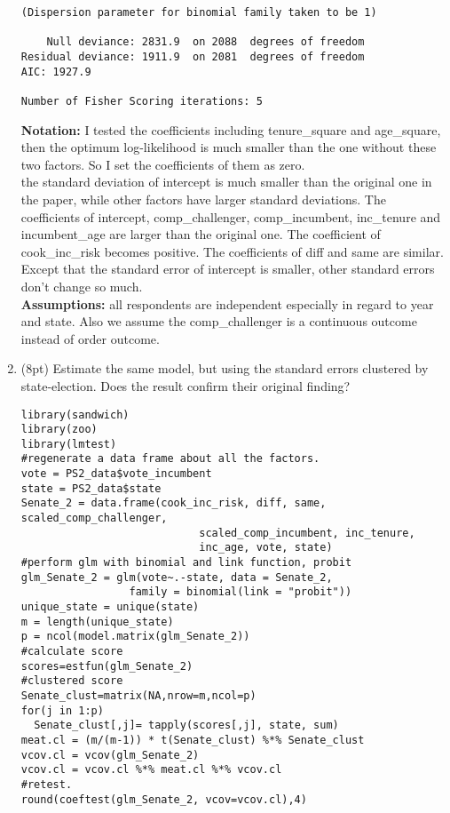 \documentclass[11pt,english]{article}
\begin{document}
\begin{enumerate}
\begin{verbatim}
(Dispersion parameter for binomial family taken to be 1)

    Null deviance: 2831.9  on 2088  degrees of freedom
Residual deviance: 1911.9  on 2081  degrees of freedom
AIC: 1927.9

Number of Fisher Scoring iterations: 5
\end{verbatim}
\textbf{Notation: }I tested the coefficients including tenure\_square and age\_square, then the optimum log-likelihood is much smaller than the one without these two factors.  So I set the coefficients of them as zero. \\
the standard deviation of intercept is much smaller than the original one in the paper, while other factors have larger standard deviations.  The coefficients of intercept, comp\_challenger, comp\_incumbent, inc\_tenure and incumbent\_age are larger than the original one. The coefficient of cook\_inc\_risk becomes positive.  The coefficients of diff and same are similar.  Except that the standard error of intercept is smaller, other standard errors don't change so much.\\
\textbf{Assumptions: } all respondents are independent especially in regard to year and state.  Also we assume the comp\_challenger is a continuous outcome instead of order outcome.





\item (8pt) Estimate the same model, but using the standard errors clustered
by state-election. Does the result confirm their original finding?


\begin{verbatim}
library(sandwich)
library(zoo)
library(lmtest)
#regenerate a data frame about all the factors.
vote = PS2_data$vote_incumbent
state = PS2_data$state
Senate_2 = data.frame(cook_inc_risk, diff, same, scaled_comp_challenger,
                            scaled_comp_incumbent, inc_tenure,
                            inc_age, vote, state)
#perform glm with binomial and link function, probit
glm_Senate_2 = glm(vote~.-state, data = Senate_2,
                 family = binomial(link = "probit"))
unique_state = unique(state)
m = length(unique_state)
p = ncol(model.matrix(glm_Senate_2))
#calculate score
scores=estfun(glm_Senate_2)
#clustered score
Senate_clust=matrix(NA,nrow=m,ncol=p)
for(j in 1:p)
  Senate_clust[,j]= tapply(scores[,j], state, sum)
meat.cl = (m/(m-1)) * t(Senate_clust) %*% Senate_clust
vcov.cl = vcov(glm_Senate_2)
vcov.cl = vcov.cl %*% meat.cl %*% vcov.cl
#retest.
round(coeftest(glm_Senate_2, vcov=vcov.cl),4)


\end{verbatim}
\end{enumerate}
\end{document}
